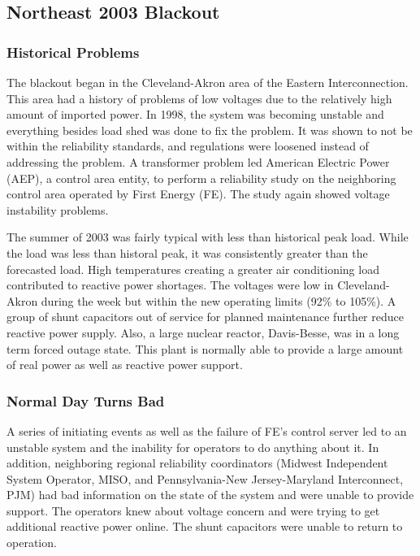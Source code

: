 
\subsection{Northeast 2003 Blackout} 


\subsubsection{Historical Problems}
The blackout began in the Cleveland-Akron area of the Eastern Interconnection.  This area had a history of problems of low voltages due to the relatively high amount of imported power.  In 1998, the system was becoming unstable and everything besides load shed was done to fix the problem.  It was shown to not be within the reliability standards, and regulations were loosened instead of addressing the problem.  A transformer problem led American Electric Power (AEP), a control area entity, to perform a reliability study on the neighboring control area operated by First Energy (FE).  The study again showed voltage instability problems.

The summer of 2003 was fairly typical with less than historical peak load.  While the load was less than historal peak, it was consistently greater than the forecasted load.  High temperatures creating a greater air conditioning load contributed to reactive power shortages.  The voltages were low in Cleveland-Akron during the week but within the new operating limits (92\% to 105\%).  A group of shunt capacitors out of service for planned maintenance further reduce reactive power supply.  Also, a large nuclear reactor, Davis-Besse, was in a long term forced outage state.  This plant is normally able to provide a large amount of real power as well as reactive power support.

\subsubsection{Normal Day Turns Bad}
A series of initiating events as well as the failure of FE's control server led to an unstable system and the inability for operators to do anything about it.  In addition, neighboring regional reliability coordinators (Midwest Independent System Operator, MISO, and Pennsylvania-New Jersey-Maryland Interconnect, PJM) had bad information on the state of the system and were unable to provide support.  The operators knew about voltage concern and were trying to get additional reactive power online.  The shunt capacitors were unable to return to operation.

